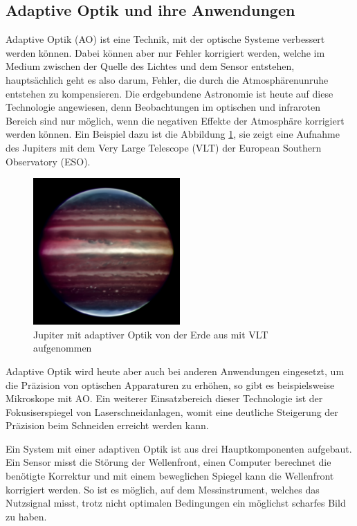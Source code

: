 \begin{refsection}
\section{Adaptive Optik und ihre Anwendungen}
Adaptive Optik (AO) ist eine Technik, mit der optische Systeme verbessert werden können. Dabei können aber nur Fehler korrigiert werden, welche im Medium zwischen der Quelle des Lichtes und dem Sensor entstehen, hauptsächlich geht es also darum, Fehler, die durch die Atmosphärenunruhe entstehen zu kompensieren. Die erdgebundene Astronomie ist heute auf diese Technologie angewiesen, denn Beobachtungen im optischen und infraroten Bereich sind nur möglich, wenn die negativen Effekte der Atmosphäre korrigiert werden können. Ein Beispiel dazu ist die Abbildung \ref{fig:jupiter}, sie zeigt eine Aufnahme des Jupiters mit dem Very Large Telescope (VLT) der European Southern Observatory (ESO).
\begin{figure}
  \centering
  \includegraphics[width=0.5\textwidth]{adaptiv/images/Jupiter_adaptiv}
  \caption{Jupiter mit adaptiver Optik von der Erde aus mit VLT aufgenommen
    \cite{eso:jupiter}}
  \label{fig:jupiter}
\end{figure}
Adaptive Optik wird heute aber auch bei anderen Anwendungen eingesetzt, um die Präzision von optischen Apparaturen zu erhöhen, so gibt es beispielsweise Mikroskope mit AO. Ein weiterer Einsatzbereich dieser Technologie ist der Fokusiserspiegel von Laserschneidanlagen, womit eine deutliche Steigerung der Präzision beim Schneiden erreicht werden kann.

Ein System mit einer adaptiven Optik ist aus drei Hauptkomponenten aufgebaut. Ein Sensor misst die Störung der Wellenfront, einen Computer berechnet die benötigte Korrektur und mit einem beweglichen Spiegel kann die Wellenfront korrigiert werden. So ist es möglich, auf dem Messinstrument, welches das Nutzsignal misst, trotz nicht optimalen Bedingungen ein möglichst scharfes Bild zu haben.


\end{refsection}
